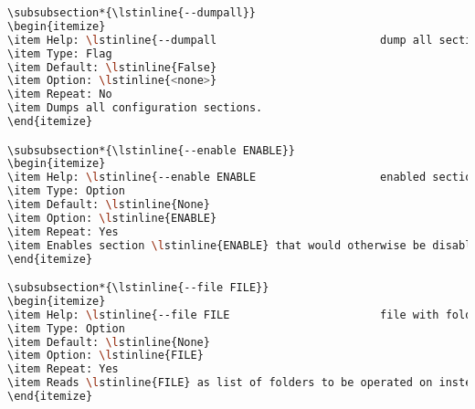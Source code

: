 \begin{snugshade}
\begin{lstlisting}[language=bash]
\subsubsection*{\lstinline{--dumpall}}
\begin{itemize}
\item Help: \lstinline{--dumpall                         dump all sections}
\item Type: Flag
\item Default: \lstinline{False}
\item Option: \lstinline{<none>}
\item Repeat: No
\item Dumps all configuration sections.
\end{itemize}

\subsubsection*{\lstinline{--enable ENABLE}}
\begin{itemize}
\item Help: \lstinline{--enable ENABLE                   enabled sections}
\item Type: Option
\item Default: \lstinline{None}
\item Option: \lstinline{ENABLE}
\item Repeat: Yes
\item Enables section \lstinline{ENABLE} that would otherwise be disabled by configuration file or command line option. Takes precedence over default disable and configuration file.
\end{itemize}

\subsubsection*{\lstinline{--file FILE}}
\begin{itemize}
\item Help: \lstinline{--file FILE                       file with folder names}
\item Type: Option
\item Default: \lstinline{None}
\item Option: \lstinline{FILE}
\item Repeat: Yes
\item Reads \lstinline{FILE} as list of folders to be operated on instead of recursively scanning filesystem. Missing folders will be generated by \lstinline{py:makecommand} or \lstinline{py:makefunction} if available and in that order.
\end{itemize}


\end{lstlisting}
\end{snugshade}
